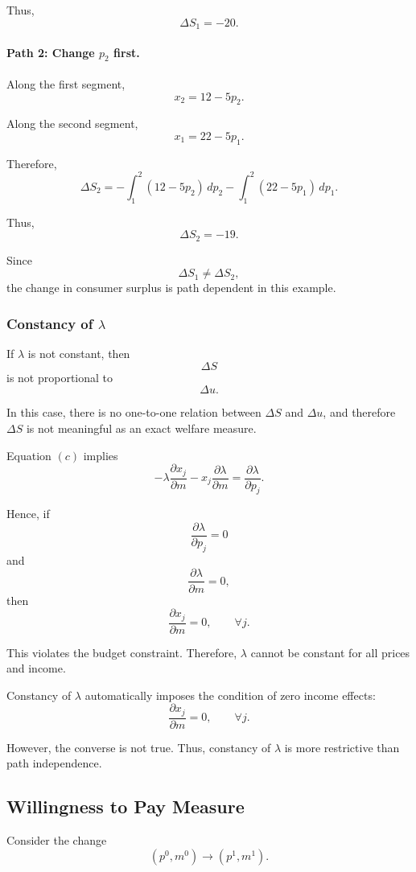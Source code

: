 Thus,
\[
\Delta S_1=-20.
\]

\paragraph{Path 2: Change \(p_2\) first.}

Along the first segment,
\[
x_2=12-5p_2.
\]

Along the second segment,
\[
x_1=22-5p_1.
\]

Therefore,
\[
\Delta S_2
=
-\int_1^2 (12-5p_2)\,dp_2
-
\int_1^2 (22-5p_1)\,dp_1.
\]

Thus,
\[
\Delta S_2=-19.
\]

Since
\[
\Delta S_1 \ne \Delta S_2,
\]
the change in consumer surplus is path dependent in this example.

\subsubsection{Constancy of \(\lambda\)}

If \(\lambda\) is not constant, then
\[
\Delta S
\]
is not proportional to
\[
\Delta u.
\]

In this case, there is no one-to-one relation between \(\Delta S\) and \(\Delta u\), and therefore \(\Delta S\) is not meaningful as an exact welfare measure.

Equation \((c)\) implies
\[
-\lambda\frac{\partial x_j}{\partial m}
-
x_j\frac{\partial \lambda}{\partial m}
=
\frac{\partial \lambda}{\partial p_j}.
\]

Hence, if
\[
\frac{\partial \lambda}{\partial p_j}=0
\]
and
\[
\frac{\partial \lambda}{\partial m}=0,
\]
then
\[
\frac{\partial x_j}{\partial m}=0,
\qquad
\forall j.
\]

This violates the budget constraint. Therefore, \(\lambda\) cannot be constant for all prices and income.

Constancy of \(\lambda\) automatically imposes the condition of zero income effects:
\[
\frac{\partial x_j}{\partial m}=0,
\qquad
\forall j.
\]

However, the converse is not true. Thus, constancy of \(\lambda\) is more restrictive than path independence.

\subsection{Willingness to Pay Measure}

Consider the change
\[
(p^0,m^0)
\to
(p^1,m^1).
\]

